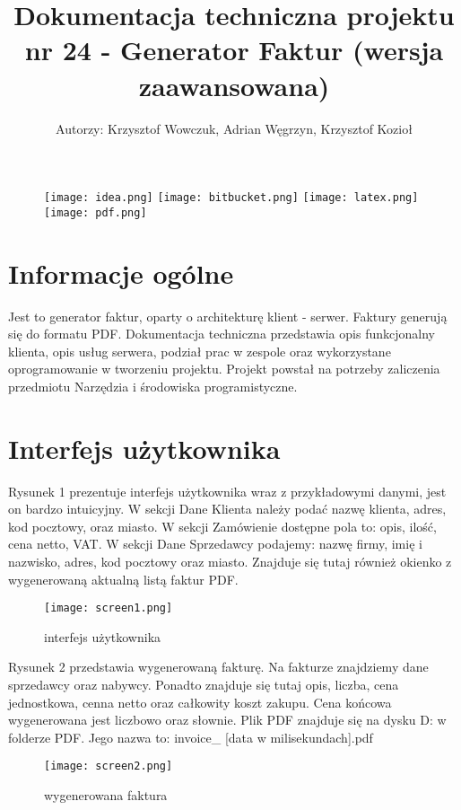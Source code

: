 \documentclass[11pt,a4paper]{article}
\author{Autorzy: Krzysztof Wowczuk, Adrian Węgrzyn, Krzysztof Kozioł}
\title{\large{ \textbf{Dokumentacja techniczna projektu nr 24 - Generator Faktur (wersja zaawansowana)}}}
\begin{document}
\maketitle
\tableofcontents

\begin{figure}[!h]
\texttt{[image: idea.png]}
\texttt{[image: bitbucket.png]}
\texttt{[image: latex.png]}
\texttt{[image: pdf.png]}
\end{figure}

\newpage
\section{Informacje ogólne}
\textsf{\hspace{8mm}Jest to generator faktur, oparty o architekturę klient - serwer. Faktury generują się do formatu PDF. Dokumentacja techniczna przedstawia opis funkcjonalny klienta, opis usług serwera, podział prac w zespole oraz wykorzystane oprogramowanie w tworzeniu projektu. Projekt powstał na potrzeby zaliczenia przedmiotu Narzędzia i środowiska programistyczne.} 


\section{Interfejs użytkownika}


\textsf{\hspace{8mm}Rysunek 1 prezentuje interfejs użytkownika wraz z przykładowymi danymi, jest on bardzo intuicyjny. W sekcji Dane Klienta należy podać nazwę klienta, adres, kod pocztowy, oraz miasto. W sekcji Zamówienie dostępne pola to: opis, ilość, cena netto, VAT. W sekcji Dane Sprzedawcy podajemy: nazwę firmy, imię i nazwisko, adres, kod pocztowy oraz miasto. Znajduje się tutaj również okienko z wygenerowaną aktualną listą faktur PDF.}

\begin{figure}[!h]
\texttt{[image: screen1.png]}
\caption{interfejs użytkownika}
\end{figure}

\textsf{\hspace{8mm}Rysunek 2 przedstawia wygenerowaną fakturę. Na fakturze znajdziemy dane sprzedawcy oraz nabywcy. Ponadto znajduje się tutaj opis, liczba, cena jednostkowa, cenna netto oraz całkowity koszt zakupu. Cena końcowa wygenerowana jest liczbowo oraz słownie. Plik PDF znajduje się na dysku D: w folderze PDF. Jego nazwa to: invoice\_ [data w milisekundach].pdf}  

\newpage
\begin{figure}[!h]
\texttt{[image: screen2.png]}
\caption{wygenerowana faktura}
\end{figure}
\end{document}
